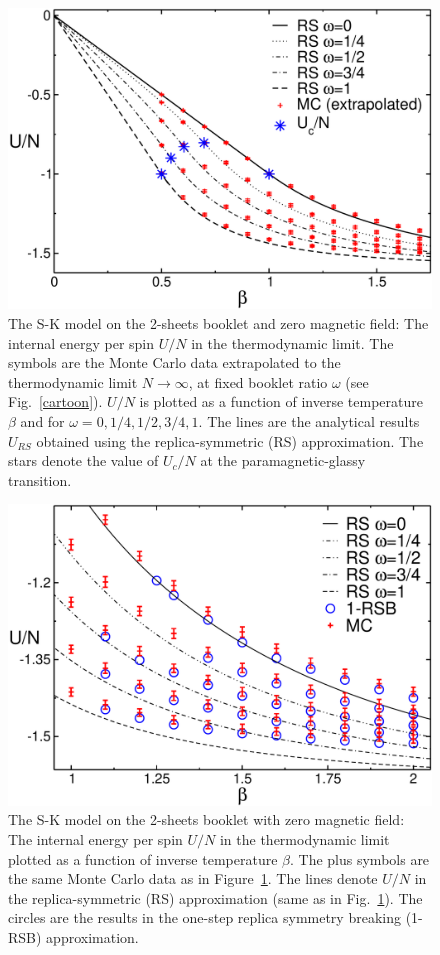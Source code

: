 \documentclass[twocolumn,superscriptaddress,prb,10pt]{revtex4-1}
\begin{document}
\begin{figure}[t]
\includegraphics*[width=0.93\linewidth]{./draft_figs/U_extrapolated}
\caption{
 The S-K model on the 2-sheets booklet and zero magnetic field: 
 The internal energy per spin $U/N$ in the thermodynamic limit. 
 The symbols are the Monte Carlo data extrapolated to the thermodynamic 
 limit $N\to\infty$, at fixed booklet ratio $\omega$ (see Fig.~\ref{cartoon}).  
 $U/N$ is plotted as a function of inverse temperature $\beta$ and for 
 $\omega=0,1/4,1/2,3/4,1$. The lines are the analytical results $U_{RS}$ 
 obtained using the replica-symmetric (RS) approximation. The stars denote 
 the value of $U_c/N$ at the paramagnetic-glassy transition. 
}
\label{U-RS}
\end{figure}

\begin{figure}[t]
\includegraphics*[width=0.93\linewidth]{./draft_figs/U_extrapolated_v1}
\caption{
 The S-K model on the 2-sheets booklet with zero magnetic field: 
 The internal energy per spin $U/N$ in the thermodynamic limit plotted 
 as a function of inverse temperature $\beta$. The plus symbols are the same 
 Monte Carlo data as in Figure~\ref{U-RS}. The lines denote $U/N$ 
 in the replica-symmetric (RS) approximation (same as in Fig.~\ref{U-RS}). 
 The circles are the results  in the one-step replica symmetry breaking 
 (1-RSB) approximation.
}
\label{U-RSB-1}
\end{figure}
\end{document}
